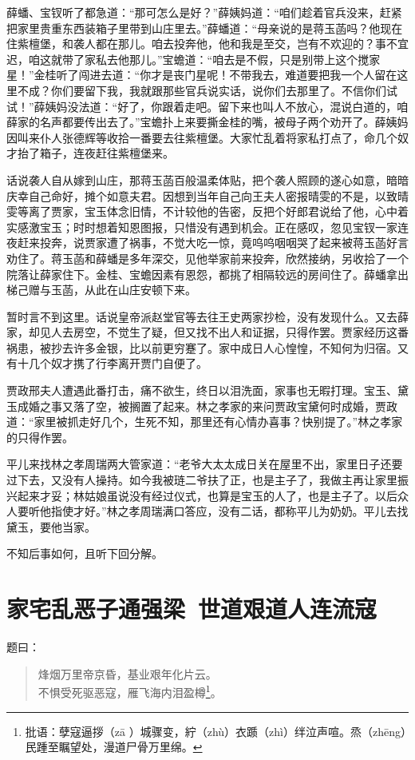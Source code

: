 \documentclass[12pt,oneside]{book}
\newenvironment{shici}{%
\begin{verse}%
\centering\large\hspace{12pt}}%
{\end{verse}}
\begin{document}
薛蟠、宝钗听了都急道：“那可怎么是好？”薛姨妈道：“咱们趁着官兵没来，赶紧把家里贵重东西装箱子里带到山庄里去。”薛蟠道：“母亲说的是蒋玉菡吗？他现在住紫檀堡，和袭人都在那儿。咱去投奔他，他和我是至交，岂有不欢迎的？事不宜迟，咱这就带了家私去他那儿。”宝蟾道：“咱去是不假，只是别带上这个搅家星！”金桂听了闯进去道：“你才是丧门星呢！不带我去，难道要把我一个人留在这里不成？你们要留下我，我就跟那些官兵说实话，说你们去那里了。不信你们试试！”薛姨妈没法道：“好了，你跟着走吧。留下来也叫人不放心，混说白道的，咱薛家的名声都要传出去了。”宝蟾扑上来要撕金桂的嘴，被母子两个劝开了。薛姨妈因叫来仆人张德辉等收拾一番要去往紫檀堡。大家忙乱着将家私打点了，命几个奴才抬了箱子，连夜赶往紫檀堡来。

话说袭人自从嫁到山庄，那蒋玉菡百般温柔体贴，把个袭人照顾的遂心如意，暗暗庆幸自己命好，摊个如意夫君。因想到当年自己向王夫人密报晴雯的不是，以致晴雯等离了贾家，宝玉体念旧情，不计较他的告密，反把个好郎君说给了他，心中着实感激宝玉；时时想着知恩图报，只惜没有遇到机会。正在感叹，忽见宝钗一家连夜赶来投奔，说贾家遭了祸事，不觉大吃一惊，竟呜呜咽咽哭了起来被蒋玉菡好言劝住了。蒋玉菡和薛蟠是多年深交，见他举家前来投奔，欣然接纳，另收拾了一个院落让薛家住下。金桂、宝蟾因素有恩怨，都挑了相隔较远的房间住了。薛蟠拿出梯己赠与玉菡，从此在山庄安顿下来。

暂时言不到这里。话说皇帝派赵堂官等去往王史两家抄检，没有发现什么。又去薛家，却见人去房空，不觉生了疑，但又找不出人和证据，只得作罢。贾家经历这番祸患，被抄去许多金银，比以前更穷蹇了。家中成日人心惶惶，不知何为归宿。又有十几个奴才携了行李离开贾门自便了。

贾政邢夫人遭遇此番打击，痛不欲生，终日以泪洗面，家事也无暇打理。宝玉、黛玉成婚之事又落了空，被搁置了起来。林之孝家的来问贾政宝黛何时成婚，贾政道：“家里被抓走好几个，生死不知，那里还有心情办喜事？快别提了。”林之孝家的只得作罢。

平儿来找林之孝周瑞两大管家道：“老爷大太太成日关在屋里不出，家里日子还要过下去，又没有人操持。如今我被琏二爷扶了正，也是主子了，我做主再让家里振兴起来才妥；林姑娘虽说没有经过仪式，也算是宝玉的人了，也是主子了。以后众人要听他指使才好。”林之孝周瑞满口答应，没有二话，都称平儿为奶奶。平儿去找黛玉，要他当家。

不知后事如何，且听下回分解。
 
 
\chapter{家宅乱恶子通强梁~世道艰道人连流寇}

题曰：

\begin{shici}
烽烟万里帝京昏，基业艰年化片云。\\
不惧受死驱恶寇，雁飞海内泪盈樽\footnote{批语：孽寇逼拶（zā ）城骤变，紵（zhù）衣踬（zhì）绊泣声喧。烝（zhēng）民踵至瞩望处，漫道尸骨万里绵。}。
\end{shici}
\end{document}
